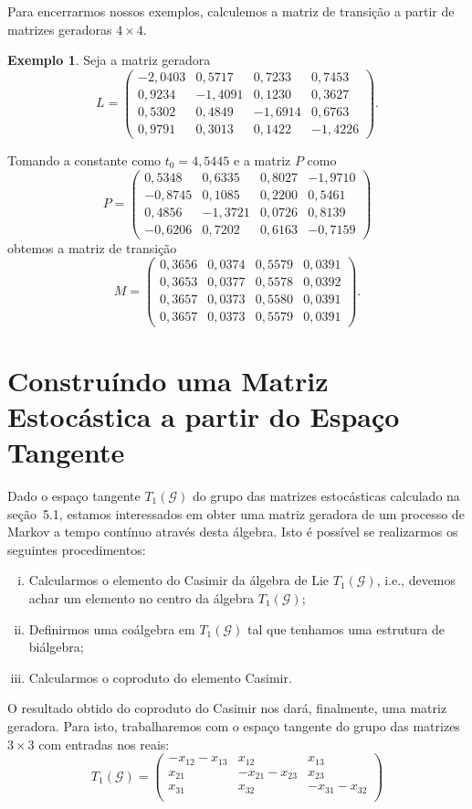 \documentclass[twoside,openright,titlepage,numbers=noenddot,headinclude,  lineheaders footinclude=true,cleardoublepage=empty,
                                BCOR=5mm,paper=a4,fontsize=12pt ]{scrbook}
\theoremstyle{definition}
\newtheorem{exmp}{Exemplo}[section]
\begin{document}
Para encerrarmos nossos exemplos, calculemos a matriz de transição a partir
de matrizes geradoras $4 \times 4$.
\begin{exmp}
Seja a matriz geradora 
\[
L =
\begin{pmatrix}
-2,0403& 0,5717 & 0,7233 & 0,7453\\
 0,9234& -1,4091& 0,1230 & 0,3627\\
 0,5302& 0,4849 & -1,6914& 0,6763\\
 0,9791& 0,3013 & 0,1422 & -1,4226
\end{pmatrix}
.
\]

Tomando a constante como $t_0 = 4,5445$ e a matriz $P$ como
\[
P =
\begin{pmatrix}
0,5348 & 0,6335 & 0,8027& -1,9710\\
-0,8745& 0,1085 & 0,2200& 0,5461\\
0,4856 & -1,3721& 0,0726& 0,8139\\
-0,6206& 0,7202 & 0,6163& -0,7159
\end{pmatrix}
\]
obtemos a matriz de transição
\[
M =
\begin{pmatrix}
0,3656& 0,0374& 0,5579& 0,0391\\
0,3653& 0,0377& 0,5578& 0,0392\\
0,3657& 0,0373& 0,5580& 0,0391\\
0,3657& 0,0373& 0,5579& 0,0391
\end{pmatrix}
.
\]
\end{exmp}

\section{Constru\'indo uma Matriz Estoc\'astica a partir do Espa\c{c}o Tangente} \label{sec:matrizL}
Dado o espaço tangente $T_1(\mathcal{G})$ do grupo das matrizes estocásticas calculado
na seção~5.1, estamos interessados em obter uma matriz geradora de um processo de Markov
a tempo contínuo através desta álgebra. Isto é possível se realizarmos os seguintes procedimentos:
\begin{enumerate}[(i)]
    \item Calcularmos o elemento do Casimir da álgebra de Lie $T_1(\mathcal{G})$, i.e., 
		  devemos achar um elemento no centro da álgebra $T_1(\mathcal{G})$;
    \item Definirmos uma coálgebra em $T_1(\mathcal{G})$ tal que tenhamos uma estrutura de biálgebra;
    \item Calcularmos o coproduto do elemento Casimir.
\end{enumerate}
O resultado obtido do coproduto do Casimir nos dará, finalmente, uma matriz geradora.
Para isto, trabalharemos com o espaço tangente do grupo das matrizes $3 \times 3$ com entradas nos reais:
\[
T_1(\mathcal{G}) =
\begin{pmatrix}
-x_{12} -x_{13}& x_{12}& x_{13}\\
x_{21}& -x_{21} -x_{23}& x_{23}\\
x_{31}& x_{32}& -x_{31} -x_{32}\\
\end{pmatrix}
\]
\end{document}

